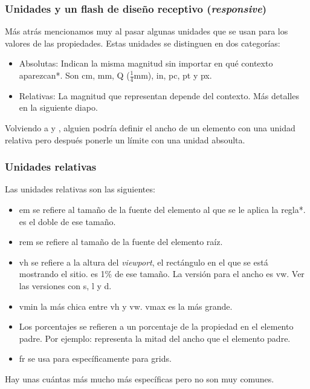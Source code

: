 \begin{frame}
\frametitle{Unidades y un flash de diseño receptivo (\emph{responsive})}

    Más atrás mencionamos muy al pasar algunas unidades que se usan para los 
    valores de las propiedades. Estas unidades se distinguen en dos categorías:

    \begin{itemize}
        \item Absolutas: Indican la misma magnitud sin importar en qué contexto 
              aparezcan*. Son cm, mm, Q ($\frac{1}{4}$mm), in, pc, pt y px.
        \item Relativas: La magnitud que representan depende del contexto. Más 
              detalles en la siguiente diapo.
    \end{itemize}

    Volviendo a  y , alguien podría 
    definir el ancho de un elemento con una unidad relativa pero después ponerle 
    un límite con una unidad absoulta.

\end{frame}

\begin{frame}
\frametitle{Unidades relativas}

    Las unidades relativas son las siguientes:

    \begin{itemize}
        \item em se refiere al tamaño de la fuente del elemento al que se le 
              aplica la regla*. \inlinecode{2em} es el doble de ese tamaño.
        \item rem se refiere al tamaño de la fuente del elemento raíz.
        \item vh se refiere a la altura del \emph{viewport}, el rectángulo en el 
              que se está mostrando el sitio.  es 1\% de ese tamaño. La 
              versión para el ancho es vw. Ver las versiones con s, l y d.
        \item vmin la más chica entre vh y vw. vmax es la más grande.
        \item Los porcentajes se refieren a un porcentaje de la propiedad en el 
              elemento padre. Por ejemplo:  representa 
              la mitad del ancho que el elemento padre.
        \item fr se usa para específicamente para grids.
    \end{itemize}

    Hay unas cuántas más mucho más específicas pero no son muy comunes.

\end{frame}

